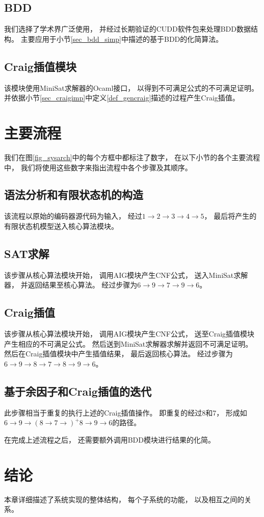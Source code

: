 \subsection{BDD}
我们选择了学术界广泛使用，
并经过长期验证的CUDD软件包来处理BDD数据结构。
主要应用于小节\ref{sec_bdd_simp}中描述的基于BDD的化简算法。


\subsection{Craig插值模块}
该模块使用MiniSat求解器的Ocaml接口，
以得到不可满足公式的不可满足证明。
并依据小节\ref{sec_craigimp}中定义\ref{def_gencraig}描述的过程产生Craig插值。

\section{主要流程}
我们在图\ref{fig_sysarch}中的每个方框中都标注了数字，
在以下小节的各个主要流程中，
我们将使用这些数字来指出流程中各个步骤及其顺序。

\subsection{语法分析和有限状态机的构造}
该流程以原始的编码器源代码为输入，
经过$1\to 2\to 3\to 4\to 5$，
最后将产生的有限状态机模型送入核心算法模块。

\subsection{SAT求解}
该步骤从核心算法模块开始，
调用AIG模块产生CNF公式，
送入MiniSat求解器，
并返回结果至核心算法。
经过步骤为$6\to 9\to 7\to 9\to 6$。

\subsection{Craig插值}
该步骤从核心算法模块开始，
调用AIG模块产生CNF公式，
送至Craig插值模块产生相应的不可满足公式。
然后送到MiniSat求解器求解并返回不可满足证明。
然后在Craig插值模块中产生插值结果，
最后返回核心算法。
经过步骤为$6\to 9 \to 8 \to 7 \to 8 \to 9 \to 6$。


\subsection{基于余因子和Craig插值的迭代}
此步骤相当于重复的执行上述的Craig插值操作。
即重复的经过8和7，
形成如$6\to 9 \to (8 \to 7 \to)^{+} 8 \to 9 \to 6$的路径。

在完成上述流程之后，
还需要额外调用BDD模块进行结果的化简。

\section{结论}\label{hahahahah}
本章详细描述了系统实现的整体结构，
每个子系统的功能，
以及相互之间的关系。
